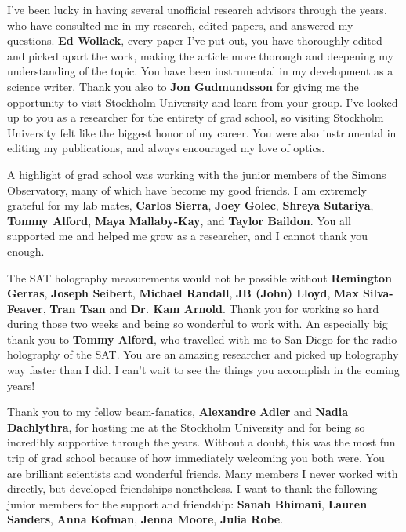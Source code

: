 \documentclass{ucetd}
\begin{document}
I've been lucky in having several unofficial research advisors through the years, who have consulted me in my research, edited papers, and answered my questions.  \textbf{Ed Wollack}, every paper I've put out, you have thoroughly edited and picked apart the work, making the article more thorough and deepening my understanding of the topic.  You have been instrumental in my development as a science writer.  Thank you also to \textbf{Jon Gudmundsson} for giving me the opportunity to visit Stockholm University and learn from your group.  I've looked up to you as a researcher for the entirety of grad school, so visiting Stockholm University felt like the biggest honor of my career.  You were also instrumental in editing my publications, and always encouraged my love of optics.

A highlight of grad school was working with the junior members of the Simons Observatory, many of which have become my good friends.  I am extremely grateful for my lab mates, \textbf{Carlos Sierra}, \textbf{Joey Golec}, \textbf{Shreya Sutariya}, \textbf{Tommy Alford}, \textbf{Maya Mallaby-Kay}, and \textbf{Taylor Baildon}.  You all supported me and helped me grow as a researcher, and I cannot thank you enough.

The SAT holography measurements would not be possible without \textbf{Remington Gerras}, \textbf{Joseph Seibert}, \textbf{Michael Randall}, \textbf{JB (John) Lloyd}, \textbf{Max Silva-Feaver}, \textbf{Tran Tsan} and \textbf{Dr. Kam Arnold}.  Thank you for working so hard during those two weeks and being so wonderful to work with.  An especially big thank you to \textbf{Tommy Alford}, who travelled with me to San Diego for the radio holography of the SAT.  You are an amazing researcher and picked up holography way faster than I did.  I can't wait to see the things you accomplish in the coming years!

Thank you to my fellow beam-fanatics, \textbf{Alexandre Adler} and \textbf{Nadia Dachlythra}, for hosting me at the Stockholm University and for being so incredibly supportive through the years.  Without a doubt, this was the most fun trip of grad school because of how immediately welcoming you both were.  You are brilliant scientists and wonderful friends.  Many members I never worked with directly, but developed friendships nonetheless.  I want to thank the following junior members for the support and friendship: \textbf{Sanah Bhimani}, \textbf{Lauren Sanders}, \textbf{Anna Kofman}, \textbf{Jenna Moore}, \textbf{Julia Robe}.
\end{document}
